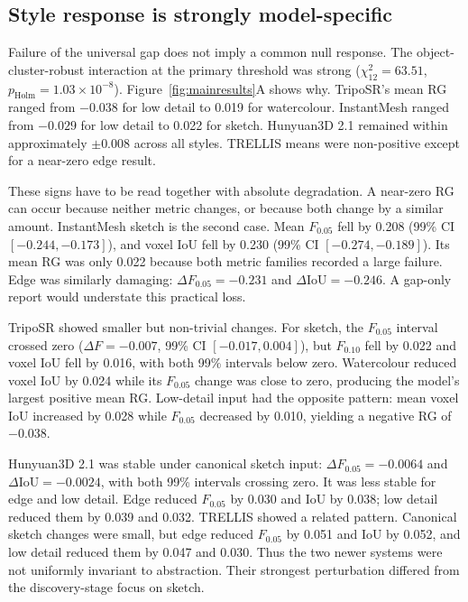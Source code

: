 \documentclass[12pt,a4paper]{article}
\begin{document}
\subsection{Style response is strongly model-specific}

Failure of the universal gap does not imply a common null response. The object-cluster-robust interaction at the primary threshold was strong ($\chi^2_{12}=63.51$, $p_{\mathrm{Holm}}=1.03\times10^{-8}$). Figure~\ref{fig:mainresults}A shows why. TripoSR's mean RG ranged from $-0.038$ for low detail to 0.019 for watercolour. InstantMesh ranged from $-0.029$ for low detail to 0.022 for sketch. Hunyuan3D 2.1 remained within approximately $\pm0.008$ across all styles. TRELLIS means were non-positive except for a near-zero edge result.

These signs have to be read together with absolute degradation. A near-zero RG can occur because neither metric changes, or because both change by a similar amount. InstantMesh sketch is the second case. Mean $F_{0.05}$ fell by 0.208 (99\% CI $[-0.244,-0.173]$), and voxel IoU fell by 0.230 (99\% CI $[-0.274,-0.189]$). Its mean RG was only 0.022 because both metric families recorded a large failure. Edge was similarly damaging: $\Delta F_{0.05}=-0.231$ and $\Delta\mathrm{IoU}=-0.246$. A gap-only report would understate this practical loss.

TripoSR showed smaller but non-trivial changes. For sketch, the $F_{0.05}$ interval crossed zero ($\Delta F=-0.007$, 99\% CI $[-0.017,0.004]$), but $F_{0.10}$ fell by 0.022 and voxel IoU fell by 0.016, with both 99\% intervals below zero. Watercolour reduced voxel IoU by 0.024 while its $F_{0.05}$ change was close to zero, producing the model's largest positive mean RG. Low-detail input had the opposite pattern: mean voxel IoU increased by 0.028 while $F_{0.05}$ decreased by 0.010, yielding a negative RG of $-0.038$.

Hunyuan3D 2.1 was stable under canonical sketch input: $\Delta F_{0.05}=-0.0064$ and $\Delta\mathrm{IoU}=-0.0024$, with both 99\% intervals crossing zero. It was less stable for edge and low detail. Edge reduced $F_{0.05}$ by 0.030 and IoU by 0.038; low detail reduced them by 0.039 and 0.032. TRELLIS showed a related pattern. Canonical sketch changes were small, but edge reduced $F_{0.05}$ by 0.051 and IoU by 0.052, and low detail reduced them by 0.047 and 0.030. Thus the two newer systems were not uniformly invariant to abstraction. Their strongest perturbation differed from the discovery-stage focus on sketch.
\end{document}
